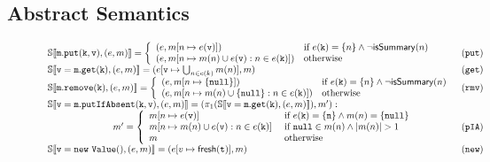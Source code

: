 \subsection{Abstract Semantics}
\label{sect:abstractsemantics}

\begin{figure*}
\footnotesize
\[
\begin{array}{ll}
\mathbb{S}\llbracket \mathtt{m.put(k, v)}, (e, m) \rrbracket = \left\{
\begin{array}{ll}
(e, m[n \mapsto e(\mathtt{v})]) & \textrm{if } e(\mathtt{k})=\{n\} \land \neg \mathsf{isSummary}(n)\\
(e, m[n \mapsto m(n) \cup e(\mathtt{v}) : n \in e(\mathtt{k})]) & \textrm{otherwise}\\
\end{array}
\right. & (\mathtt{put})\\
\mathbb{S}\llbracket \mathtt{v=m.get(k)}, (e, m) \rrbracket = (e[\mathtt{v} \mapsto \bigcup_{n \in e(k)} m(n)], m) & (\mathtt{get})\\
\mathbb{S}\llbracket \mathtt{m.remove(k)}, (e, m) \rrbracket =  \left\{
\begin{array}{ll}
(e, m[n \mapsto \{\mathtt{null}\}]) & \textrm{if } e(\mathtt{k})=\{n\} \land \neg \mathsf{isSummary}(n)\\
(e, m[n \mapsto m(n) \cup \{\mathtt{null}\} : n \in e(\mathtt{k})]) & \textrm{otherwise}\\
\end{array}
\right. & (\mathtt{rmv})\\ 
\mathbb{S}\llbracket \mathtt{v = m.putIfAbsent(k, v)}, (e, m) \rrbracket =  (\pi_1(\mathbb{S}\llbracket \mathtt{v = m.get(k)}, (e, m) \rrbracket), m') : & \\
\hspace{70pt} 
m'=
\left\{
\begin{array}{ll}
m[n \mapsto e(\mathtt{v})] & \textrm{ if } e(\mathtt{k})=\{\mathtt{n}\} \land m(n) = \{\mathtt{null}\}\\
m[n \mapsto m(n) \cup e(\mathtt{v}) : n \in e(\mathtt{k})] & \textrm{ if } \mathtt{null} \in m(n) \land |m(n)| > 1\\
m & \textrm{ otherwise}\\
\end{array}
\right. & (\mathtt{pIA})\\
\mathbb{S}\llbracket \mathtt{v = new\ Value()}, (e, m) \rrbracket =  (e[v \mapsto \mathsf{fresh}(\mathtt{t})], m)& (\mathtt{new})\\

\end{array}\]
\end{figure*}
